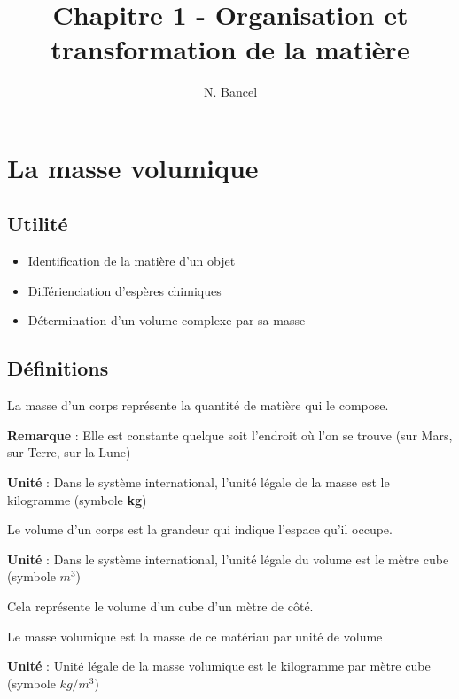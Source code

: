 \documentclass[a4paper,12pt]{article}
\begin{document}
\title{Chapitre 1 - Organisation et transformation de la matière}
\author{N. Bancel}

\maketitle

\section*{La masse volumique}

\subsection*{Utilité}
\begin{itemize}[noitemsep]
  \item Identification de la matière d'un objet
  \item Différienciation d'espères chimiques
  \item Détermination d'un volume complexe par sa masse 
\end{itemize}


\subsection*{Définitions}

\begin{tcolorbox}
La masse d'un corps représente la quantité de matière qui le compose. \par
\textbf{Remarque} : Elle est constante quelque soit l'endroit où l'on se trouve (sur Mars, sur Terre, sur la Lune) \par
\textbf{Unité} : Dans le système international, l'unité légale de la masse est le kilogramme (symbole \textbf{kg})

\end{tcolorbox}

\begin{tcolorbox}
  Le volume d'un corps est la grandeur qui indique l'espace qu'il occupe. \par
  \textbf{Unité} : Dans le système international, l'unité légale du volume est le mètre cube (symbole \textbf{$m^3$})
\end{tcolorbox}

Cela représente le volume d'un cube d'un mètre de côté.

\begin{tcolorbox}
  Le masse volumique est la masse de ce matériau par unité de volume \par
  \textbf{Unité} : Unité légale de la masse volumique est le kilogramme par mètre cube (symbole \textbf{$kg / m^3$})
\end{tcolorbox}
\end{document}
